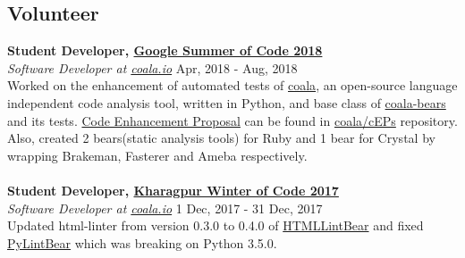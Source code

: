 \documentclass[margin, centered]{res}
\begin{document}
\begin{resume}
        \section{Volunteer}
            \textbf{Student Developer, \href{https://summerofcode.withgoogle.com/}{Google Summer of Code 2018}} \\
            \emph{Software Developer at \href{https://coala.io/}{coala.io}} \hfill Apr, 2018 - Aug, 2018 \\
            Worked on the enhancement of automated tests of \href{https://github.com/coala/coala}{coala},
            an open-source language independent code analysis tool, written in Python, and base
            class of \href{https://github.com/coala/coala-bears}{coala-bears} and its tests.
            \href{https://github.com/coala/cEPs/blob/master/cEP-0027.md}{Code Enhancement Proposal} can be found
            in \href{https://github.com/coala/cEPs}{coala/cEPs} repository. Also, created 2 bears(static analysis tools)
            for Ruby and 1 bear for Crystal by wrapping Brakeman, Fasterer and Ameba respectively. \\
            \\
            \textbf{Student Developer, \href{https://kwoc.kossiitkgp.in}{Kharagpur Winter of Code 2017}} \\
            \emph{Software Developer at \href{https://coala.io/}{coala.io}} \hfill 1 Dec, 2017 - 31 Dec, 2017 \\
            Updated html-linter from version 0.3.0 to 0.4.0 of
            \href{https://github.com/coala/coala-bears/pull/2148/commits/631ed37f7322fae7b9d7e16616f8c4009b9adb7e}{HTMLLintBear}
            and fixed \href{https://github.com/coala/coala-bears/blob/master/bears/python/PyLintBear.py}{PyLintBear} which was
            breaking on Python 3.5.0.


\end{resume}
\end{document}

